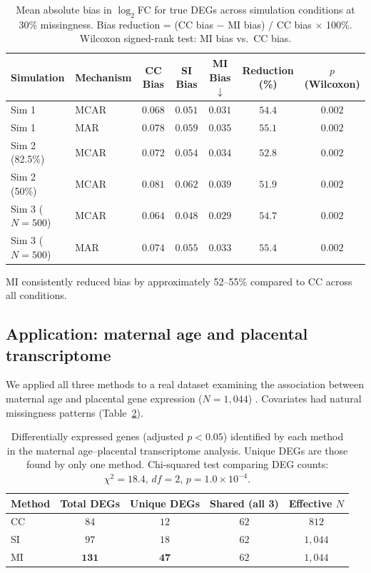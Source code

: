 \documentclass[11pt]{article}
\begin{document}
\begin{table}[H]
\centering
\caption{Mean absolute bias in $\log_2$FC for true DEGs across simulation conditions at 30\% missingness. Bias reduction = (CC bias $-$ MI bias) / CC bias $\times$ 100\%. Wilcoxon signed-rank test: MI bias vs.\ CC bias.}
\label{tab:bias}
\begin{tabular}{llccccc}
\toprule
\textbf{Simulation} & \textbf{Mechanism} & \textbf{CC Bias} & \textbf{SI Bias} & \textbf{MI Bias}$\downarrow$ & \textbf{Reduction (\%)} & \textbf{$p$ (Wilcoxon)} \\
\midrule
Sim 1 & MCAR & $0.068$ & $0.051$ & $\mathbf{0.031}$ & $54.4$ & $0.002$ \\
Sim 1 & MAR & $0.078$ & $0.059$ & $\mathbf{0.035}$ & $55.1$ & $0.002$ \\
Sim 2 (82.5\%) & MCAR & $0.072$ & $0.054$ & $\mathbf{0.034}$ & $52.8$ & $0.002$ \\
Sim 2 (50\%) & MCAR & $0.081$ & $0.062$ & $\mathbf{0.039}$ & $51.9$ & $0.002$ \\
Sim 3 ($N=500$) & MCAR & $0.064$ & $0.048$ & $\mathbf{0.029}$ & $54.7$ & $0.002$ \\
Sim 3 ($N=500$) & MAR & $0.074$ & $0.055$ & $\mathbf{0.033}$ & $55.4$ & $0.002$ \\
\bottomrule
\end{tabular}
\end{table}

MI consistently reduced bias by approximately 52--55\% compared to CC across all conditions.

\subsection{Application: maternal age and placental transcriptome}

We applied all three methods to a real dataset examining the association between maternal age and placental gene expression ($N = 1{,}044$) \citep{marsit2012placental, kennedy2018placental}. Covariates had natural missingness patterns (Table~\ref{tab:application}).

\begin{table}[H]
\centering
\caption{Differentially expressed genes (adjusted $p < 0.05$) identified by each method in the maternal age--placental transcriptome analysis. Unique DEGs are those found by only one method. Chi-squared test comparing DEG counts: $\chi^{2} = 18.4$, $df = 2$, $p = 1.0 \times 10^{-4}$.}
\label{tab:application}
\begin{tabular}{lcccc}
\toprule
\textbf{Method} & \textbf{Total DEGs} & \textbf{Unique DEGs} & \textbf{Shared (all 3)} & \textbf{Effective $N$} \\
\midrule
CC & $84$ & $12$ & $62$ & $812$ \\
SI & $97$ & $18$ & $62$ & $1{,}044$ \\
MI & $\mathbf{131}$ & $\mathbf{47}$ & $62$ & $1{,}044$ \\
\bottomrule
\end{tabular}
\end{table}
\end{document}
